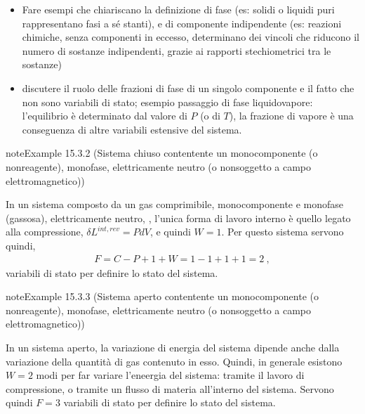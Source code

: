 \documentclass[letterpaper,10pt,italian]{jupyterBook}
\begin{document}
\sphinxAtStartPar
{}
\begin{itemize}
\item {} 
\sphinxAtStartPar
Fare esempi che chiariscano la definizione di fase (es: solidi o liquidi puri rappresentano fasi a sé stanti), e di componente indipendente (es: reazioni chimiche, senza componenti in eccesso, determinano dei vincoli che riducono il numero di sostanze indipendenti, grazie ai rapporti stechiometrici tra le sostanze)

\item {} 
\sphinxAtStartPar
discutere il ruolo delle frazioni di fase di un singolo componente e il fatto che non sono variabili di stato; esempio passaggio di fase liquido\sphinxhyphen{}vapore: l’equilibrio è determinato dal valore di \(P\) (o di \(T\)), la frazione di vapore è una conseguenza di altre variabili estensive del sistema.

\end{itemize}
\label{ch/thermodynamics/principles-gibbs-phase-rule:example-5}
\begin{sphinxadmonition}{note}{Example 15.3.2 (Sistema chiuso contentente un monocomponente (o non\sphinxhyphen{}reagente), monofase, elettricamente neutro (o non\sphinxhyphen{}soggetto a campo elettromagnetico))}



\sphinxAtStartPar
In un sistema composto da un gas comprimibile, monocomponente e monofase (gassosa), elettricamente neutro,  , l’unica forma di lavoro interno è quello legato alla compressione, \(\delta L^{int,rev} = P dV\), e quindi \(W = 1\). Per questo sistema servono quindi,
\begin{equation*}
\begin{split}F = C - P + 1 + W = 1 - 1 + 1 + 1 = 2 \ ,\end{split}
\end{equation*}
\sphinxAtStartPar
variabili di stato per definire lo stato del sistema.
\end{sphinxadmonition}
\label{ch/thermodynamics/principles-gibbs-phase-rule:example-6}
\begin{sphinxadmonition}{note}{Example 15.3.3 (Sistema aperto contentente un monocomponente (o non\sphinxhyphen{}reagente), monofase, elettricamente neutro (o non\sphinxhyphen{}soggetto a campo elettromagnetico))}



\sphinxAtStartPar
In un sistema aperto, la variazione di energia del sistema dipende anche dalla variazione della quantità di gas contenuto in esso. Quindi, in generale esistono \(W = 2\) modi per far variare l’eneergia del sistema: tramite il lavoro di compressione, o tramite un flusso di materia all’interno del sistema. Servono quindi \(F=3\) variabili di stato per definire lo stato del sistema.
\end{sphinxadmonition}
\end{document}
